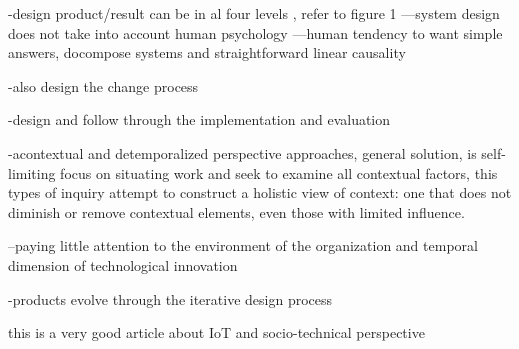 \begin{svgraybox}
-design product/result can be in al four levels , refer to figure 1
---system design does not take into account human psychology
---human tendency to want simple answers, docompose systems and straightforward linear causality 

-also design the change process

-design and follow through the implementation and evaluation 

-acontextual and detemporalized perspective approaches, general solution, is self-limiting 
focus on situating work and seek to examine all contextual factors, this types of inquiry attempt to construct a holistic view of context: one that does not diminish or remove contextual elements, even those with limited influence. 

--paying little attention to the environment of the organization and temporal dimension of technological innovation  \cite{Sawyer2014}

-products evolve through the iterative design process

\end{svgraybox}


\begin{svgraybox}

\item \cite{Shin2014} this is a very good article about IoT and socio-technical perspective 

\end{svgraybox}


